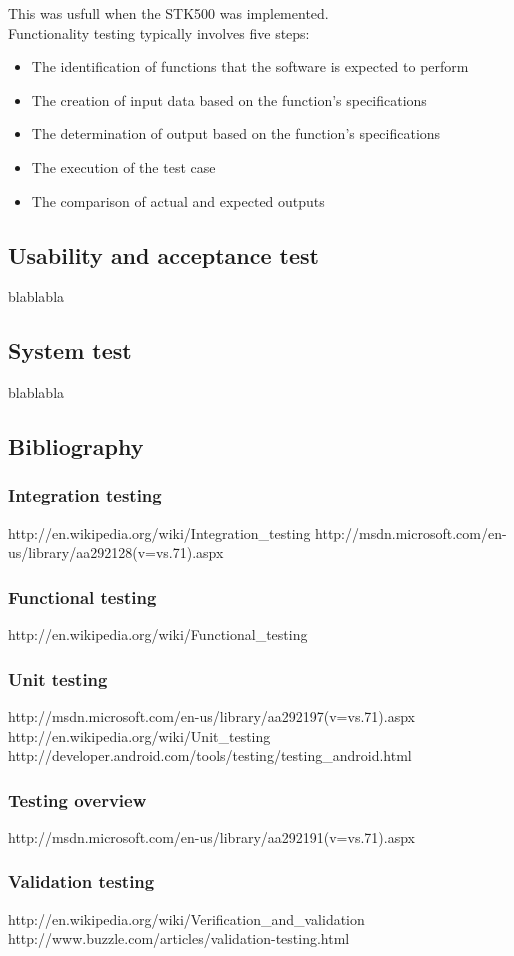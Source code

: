 			This was usfull when the STK500 was implemented.\\

			Functionality testing typically involves five steps:\\
			\begin{itemize}
			\item{The identification of functions that the software is expected to perform}
			\item{The creation of input data based on the function's specifications}
			\item{The determination of output based on the function's specifications}
			\item{The execution of the test case}
			\item{The comparison of actual and expected outputs}
			\end{itemize}

	\subsection{Usability and acceptance test}
		blablabla

	\subsection{System test}
		blablabla


\subsection{Bibliography}
	
	\subsubsection{Integration testing}
	http://en.wikipedia.org/wiki/Integration_testing
	http://msdn.microsoft.com/en-us/library/aa292128(v=vs.71).aspx

	\subsubsection{Functional testing}
	http://en.wikipedia.org/wiki/Functional_testing

	\subsubsection{Unit testing}
	http://msdn.microsoft.com/en-us/library/aa292197(v=vs.71).aspx
	http://en.wikipedia.org/wiki/Unit_testing
	http://developer.android.com/tools/testing/testing_android.html

	\subsubsection{Testing overview}
	http://msdn.microsoft.com/en-us/library/aa292191(v=vs.71).aspx

	\subsubsection{Validation testing}
	http://en.wikipedia.org/wiki/Verification_and_validation
	http://www.buzzle.com/articles/validation-testing.html